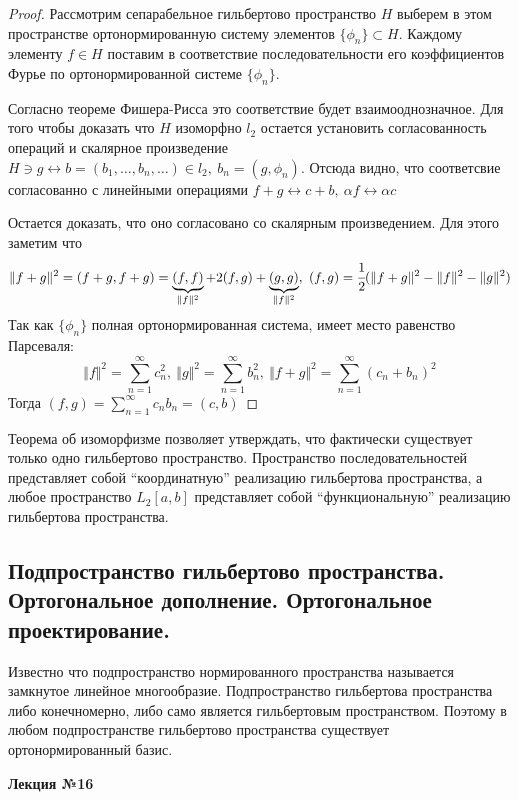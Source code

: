 \documentclass[14pt,a4paper]{extarticle}
\theoremstyle{definition}
\theoremstyle{remark}
\newcommand{\sep}{ , \ \allowbreak }
\renewcommand{\[}{\begin{dmath*}[compact]}
\renewcommand{\]}{\end{dmath*}}
\begin{document}
\begin{proof}
  Рассмотрим сепарабельное гильбертово пространство $H$ выберем в этом
  пространстве ортонормированную систему элементов $\{\phi_n\} \subset H$.
  Каждому элементу $f \in H$ поставим в соответствие последовательности его
  коэффициентов Фурье по ортонормированной системе $\{\phi_n\}$.

  Согласно теореме Фишера-Рисса это соответствие будет взаимооднозначное.
  Для того чтобы доказать что $H$ изоморфно $l_2$ остается установить
  согласованность операций и скалярное произведение
  $H \ni g \leftrightarrow b = (b_1, \dots, b_n, \dots) \in l_2 \sep
  b_n= (g,\phi_n)$.
  Отсюда видно, что соответсвие согласованно с линейными операциями
  $f+g \leftrightarrow c+b \sep \alpha f \leftrightarrow \alpha c$

  Остается доказать, что оно согласовано со скалярным произведением.
  Для этого заметим что
  \[\Vert f+g \Vert ^ 2 = (f+g, f+g)
  = \underbrace{(f,f)}_{\Vert f \Vert^2} + 2(f,g)
    + \underbrace{(g,g)}_{\Vert f \Vert^2} \sep (f,g)
  = \cfrac{1}{2}(\Vert f+g \Vert ^2 - \Vert f \Vert^2 - \Vert g \Vert ^2)\]
  Так как $\{\phi_n\}$ полная ортонормированная система, имеет место
  равенство Парсеваля:
  \[\Vert f \Vert^2 = \sum_{n=1}^\infty c_n^2 \sep
  \Vert g \Vert^2 = \sum_{n=1}^\infty b_n^2 \sep
  \Vert f+g \Vert^2 = \sum_{n=1}^\infty(c_n+b_n)^2\]
  Тогда $(f,g) = \sum_{n=1}^\infty c_n b_n = (c,b)$
\end{proof}

Теорема об изоморфизме позволяет утверждать, что фактически существует только
одно гильбертово пространство. Пространство последовательностей представляет
собой ``координатную'' реализацию гильбертова пространства,
а любое пространство $L_2[a,b]$ представляет собой ``функциональную''
реализацию гильбертова пространства.

\subsection{Подпространство гильбертово пространства. Ортогональное дополнение.
Ортогональное проектирование.}

Известно что подпространство нормированного пространства называется
замкнутое линейное многообразие.
Подпространство гильбертова пространства либо конечномерно,
либо само является гильбертовым пространством.
Поэтому в любом подпространстве гильбертово пространства
существует ортонормированный базис.

\textbf{Лекция №16}
\end{document}
